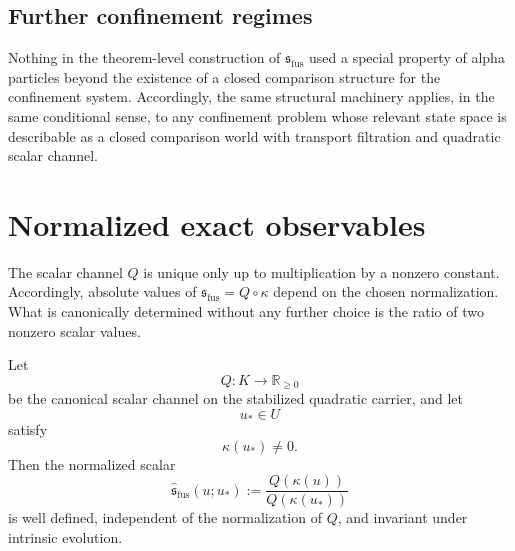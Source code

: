 \subsection{Further confinement regimes}
Nothing in the theorem-level construction of \(\mathfrak s_{\mathrm{fus}}\) used a special
property of alpha particles beyond the existence of a closed comparison
structure for the confinement system.
Accordingly, the same structural machinery applies, in the same
conditional sense, to any confinement problem whose relevant state space
is describable as a closed comparison world with transport filtration
and quadratic scalar channel.
\section{Normalized exact observables}
\label{sec:fusion-normalized}
The scalar channel \(Q\) is unique only up to multiplication by a
nonzero constant.
Accordingly, absolute values of \(\mathfrak s_{\mathrm{fus}}=Q\circ\kappa\) depend on the chosen
normalization.
What is canonically determined without any further choice is the ratio of
two nonzero scalar values.
\begin{proposition}
	Let
	\[
		Q:K\to\mathbb R_{\ge 0}
	\]
	be the canonical scalar channel on the stabilized quadratic carrier, and
	let
	\[
		u_*\in U
	\]
	satisfy
	\[
		\kappa(u_*)\neq 0.
	\]
	Then the normalized scalar
	\[
		\widehat{\mathfrak s}_{\mathrm{fus}}(u;u_*):=
		\frac{Q(\kappa(u))}{Q(\kappa(u_*))}
	\]
	is well defined, independent of the normalization of \(Q\), and
	invariant under intrinsic evolution.
\end{proposition}
